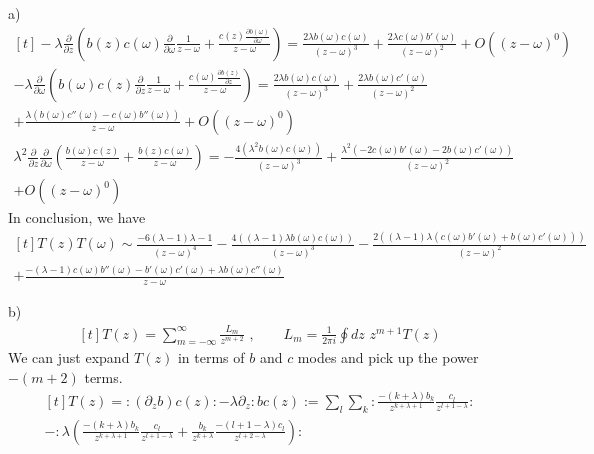 \documentclass[12pt]{article}
\begin{document}
\begin{paragraph}{a)}
\begin{equation}
\begin{aligned}[t]
-\lambda  \frac{\partial }{\partial z}\left(b(z) c(\omega ) \frac{\partial }{\partial \omega }\frac{1}{z-\omega }+\frac{c(z) \frac{\partial b(\omega )}{\partial \omega }}{z-\omega }\right)=\frac{2 \lambda  b(\omega ) c(\omega )}{(z-\omega )^3}+\frac{2 \lambda  c(\omega ) b'(\omega )}{(z-\omega )^2}+O\left((z-\omega )^0\right)\\
-\lambda  \frac{\partial }{\partial \omega }\left(b(\omega ) c(z) \frac{\partial }{\partial z}\frac{1}{z-\omega }+\frac{c(\omega ) \frac{\partial b(z)}{\partial z}}{z-\omega }\right)=\frac{2 \lambda  b(\omega ) c(\omega )}{(z-\omega )^3}+\frac{2 \lambda  b(\omega ) c'(\omega )}{(z-\omega )^2}\\
+\frac{\lambda  \left(b(\omega ) c''(\omega )-c(\omega ) b''(\omega )\right)}{z-\omega }+O\left((z-\omega )^0\right)\\
\lambda ^2 \frac{\partial }{\partial z}\frac{\partial }{\partial \omega }\left(\frac{b(\omega ) c(z)}{z-\omega }+\frac{b(z) c(\omega )}{z-\omega }\right)=-\frac{4 \left(\lambda ^2 b(\omega ) c(\omega )\right)}{(z-\omega )^3}+\frac{\lambda ^2 \left(-2 c(\omega ) b'(\omega )-2 b(\omega ) c'(\omega )\right)}{(z-\omega )^2}\\
+O\left((z-\omega )^0\right)
\end{aligned}
\end{equation}
In conclusion, we have
\begin{equation}
\begin{aligned}[t]
T(z)T(\omega)\sim \frac{-6 (\lambda -1) \lambda -1}{(z-\omega )^4}-\frac{4 ((\lambda -1) \lambda  b(\omega ) c(\omega ))}{(z-\omega )^3}-\frac{2 \left((\lambda -1) \lambda  \left(c(\omega ) b'(\omega )+b(\omega ) c'(\omega )\right)\right)}{(z-\omega )^2}\\
+\frac{-(\lambda -1) c(\omega ) b''(\omega )-b'(\omega ) c'(\omega )+\lambda  b(\omega ) c''(\omega )}{z-\omega }
\end{aligned}
\end{equation}
\end{paragraph}
\begin{paragraph}{b)}
\begin{equation}
\begin{aligned}[t]
T(z)=\sum\limits_{m=-\infty}^{\infty}\frac{L_m}{z^{m+2}}\,\, ,\qquad L_m=\frac{1}{2\pi i}\oint dz \,\, z^{m+1}T(z)
\end{aligned}
\end{equation}
We can just expand $T(z)$ in terms of $b$ and $c$ modes and pick up the power $-(m+2)$ terms.
\begin{equation}
\begin{aligned}[t]
T(z)= : (\partial_z b) c(z): - \lambda \partial_z : b c (z):=\sum\limits_l\sum\limits_k :\frac{-(k+\lambda)b_k}{z^{k+\lambda+1}}\frac{c_l}{z^{l+1-\lambda}}:\\
-:\lambda(\frac{-(k+\lambda)b_k}{z^{k+\lambda+1}}\frac{c_l}{z^{l+1-\lambda}}+\frac{b_k}{z^{k+\lambda}}\frac{-(l+1-\lambda)c_l}{z^{l+2-\lambda}}):
\end{aligned}
\end{equation}
\end{paragraph}
\end{document}
